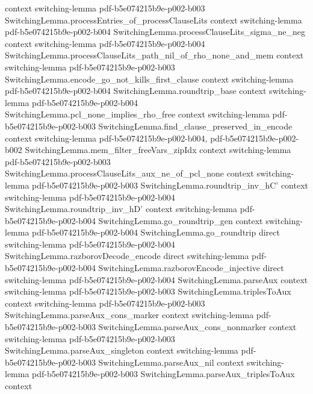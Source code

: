 \begin{lemma}
  {context}
  {switching-lemma}
  {pdf-b5e074215b9e-p002-b003}
\proofstep
  {SwitchingLemma.processEntries_of_processClauseLits}
  {context}
  {switching-lemma}
  {pdf-b5e074215b9e-p002-b004}
\proofstep
  {SwitchingLemma.processClauseLits_sigma_ne_neg}
  {context}
  {switching-lemma}
  {pdf-b5e074215b9e-p002-b004}
\proofstep
  {SwitchingLemma.processClauseLits_path_nil_of_rho_none_and_mem}
  {context}
  {switching-lemma}
  {pdf-b5e074215b9e-p002-b003}
\proofstep
  {SwitchingLemma.encode_go_not_kills_first_clause}
  {context}
  {switching-lemma}
  {pdf-b5e074215b9e-p002-b004}
\proofstep
  {SwitchingLemma.roundtrip_base}
  {context}
  {switching-lemma}
  {pdf-b5e074215b9e-p002-b004}
\proofstep
  {SwitchingLemma.pcl_none_implies_rho_free}
  {context}
  {switching-lemma}
  {pdf-b5e074215b9e-p002-b003}
\proofstep
  {SwitchingLemma.find_clause_preserved_in_encode}
  {context}
  {switching-lemma}
  {pdf-b5e074215b9e-p002-b004,
    pdf-b5e074215b9e-p002-b002}
\proofstep
  {SwitchingLemma.mem_filter_freeVars_zipIdx}
  {context}
  {switching-lemma}
  {pdf-b5e074215b9e-p002-b003}
\proofstep
  {SwitchingLemma.processClauseLits_aux_ne_of_pcl_none}
  {context}
  {switching-lemma}
  {pdf-b5e074215b9e-p002-b003}
\proofstep
  {SwitchingLemma.roundtrip_inv_hC'}
  {context}
  {switching-lemma}
  {pdf-b5e074215b9e-p002-b004}
\proofstep
  {SwitchingLemma.roundtrip_inv_hD'}
  {context}
  {switching-lemma}
  {pdf-b5e074215b9e-p002-b004}
\proofstep
  {SwitchingLemma.go_roundtrip_gen}
  {context}
  {switching-lemma}
  {pdf-b5e074215b9e-p002-b004}
\proofstep
  {SwitchingLemma.go_roundtrip}
  {direct}
  {switching-lemma}
  {pdf-b5e074215b9e-p002-b004}
\proofstep
  {SwitchingLemma.razborovDecode_encode}
  {direct}
  {switching-lemma}
  {pdf-b5e074215b9e-p002-b004}
\proofstep
  {SwitchingLemma.razborovEncode_injective}
  {direct}
  {switching-lemma}
  {pdf-b5e074215b9e-p002-b004}
\proofstep
  {SwitchingLemma.parseAux}
  {context}
  {switching-lemma}
  {pdf-b5e074215b9e-p002-b003}
\proofstep
  {SwitchingLemma.triplesToAux}
  {context}
  {switching-lemma}
  {pdf-b5e074215b9e-p002-b003}
\proofstep
  {SwitchingLemma.parseAux_cons_marker}
  {context}
  {switching-lemma}
  {pdf-b5e074215b9e-p002-b003}
\proofstep
  {SwitchingLemma.parseAux_cons_nonmarker}
  {context}
  {switching-lemma}
  {pdf-b5e074215b9e-p002-b003}
\proofstep
  {SwitchingLemma.parseAux_singleton}
  {context}
  {switching-lemma}
  {pdf-b5e074215b9e-p002-b003}
\proofstep
  {SwitchingLemma.parseAux_nil}
  {context}
  {switching-lemma}
  {pdf-b5e074215b9e-p002-b003}
\proofstep
  {SwitchingLemma.parseAux_triplesToAux}
  {context}

\end{lemma}
